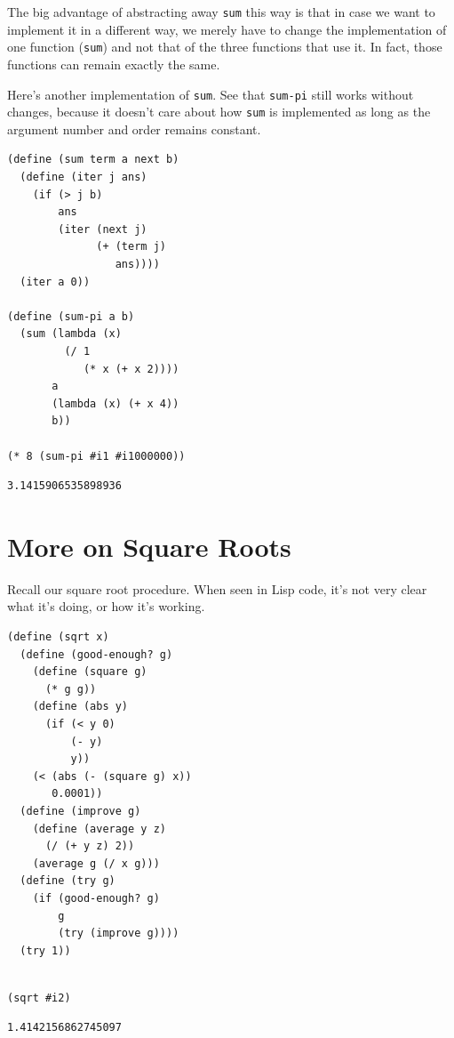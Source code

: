 \documentclass[9pt]{report}
\begin{document}
The big advantage of abstracting away \texttt{sum} this way is that in
case we want to implement it in a different way, we merely have to
change the implementation of one function (\texttt{sum}) and not that of
the three functions that use it. In fact, those functions can
remain exactly the same.

Here's another implementation of \texttt{sum}. See that \texttt{sum-pi} still
works without changes, because it doesn't care about how \texttt{sum} is
implemented as long as the argument number and order remains
constant.

\begin{verbatim}
(define (sum term a next b)
  (define (iter j ans)
    (if (> j b)
        ans
        (iter (next j)
              (+ (term j)
                 ans))))
  (iter a 0))

(define (sum-pi a b)
  (sum (lambda (x)
         (/ 1
            (* x (+ x 2))))
       a
       (lambda (x) (+ x 4))
       b))

(* 8 (sum-pi #i1 #i1000000))
\end{verbatim}

\begin{verbatim}
3.1415906535898936
\end{verbatim}

\section{More on Square Roots}
\label{sec:org91033ed}

Recall our square root procedure. When seen in Lisp code, it's not
very clear what it's doing, or how it's working.

\begin{verbatim}
(define (sqrt x)
  (define (good-enough? g)
    (define (square g)
      (* g g))
    (define (abs y)
      (if (< y 0)
          (- y)
          y))
    (< (abs (- (square g) x))
       0.0001))
  (define (improve g)
    (define (average y z)
      (/ (+ y z) 2))
    (average g (/ x g)))
  (define (try g)
    (if (good-enough? g)
        g
        (try (improve g))))
  (try 1))
\end{verbatim}

\begin{verbatim}

(sqrt #i2)
\end{verbatim}

\begin{verbatim}
1.4142156862745097
\end{verbatim}
\end{document}
